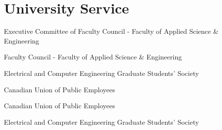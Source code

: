 \section{\sc University Service}

{
  Executive Committee of Faculty Council - Faculty of Applied Science \& Engineering
}

{
  Faculty Council - Faculty of Applied Science \& Engineering
}

{
  Electrical and Computer Engineering Graduate Students' Society
}

{
  Canadian Union of Public Employees
}

{
  Canadian Union of Public Employees
}

{
  Electrical and Computer Engineering Graduate Students' Society
}
